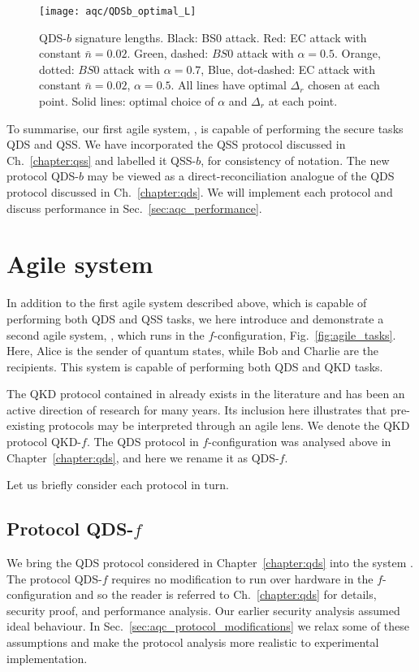 \begin{figure}[htp]
\captionsetup{width=\linewidth}
\centering
\texttt{[image: aqc/QDSb\_optimal\_L]}
\caption{\label{fig:aqc_qdsb_lengths} QDS-$b$ signature lengths. Black: BS$0$ attack. Red: EC attack with constant $\bar{n} = 0.02$. Green, dashed: $BS0$ attack with $\alpha=0.5$. Orange, dotted: $BS0$ attack with $\alpha=0.7$, Blue, dot-dashed: EC attack with constant $\bar{n}=0.02$, $\alpha=0.5$. All lines have optimal $\Delta_r$ chosen at each point. Solid lines: optimal choice of $\alpha$ and $\Delta_r$ at each point.}
\end{figure}

To summarise, our first agile system, \systemB, is capable of performing the secure tasks QDS and QSS. We have incorporated the QSS protocol discussed in Ch.~\ref{chapter:qss} and labelled it QSS-$b$, for consistency of notation. The new protocol QDS-$b$ may be viewed as a direct-reconciliation analogue of the QDS protocol discussed in Ch.~\ref{chapter:qds}. We will implement each protocol and discuss performance in Sec.~\ref{sec:aqc_performance}.

\section{Agile system \systemF}\label{sec:aqc_systemf}

In addition to the first agile system described above, which is capable of performing both QDS and QSS tasks, we here introduce and demonstrate a second agile system, \systemF, which runs in the $f$-configuration, Fig.~\ref{fig:agile_tasks}. Here, Alice is the sender of quantum states, while Bob and Charlie are the recipients. This system is capable of performing both QDS and QKD tasks.

The QKD protocol contained in \systemF \; already exists in the literature \cite{Leverrier2011, Papanastasiou2018} and has been an active direction of research for many years. Its inclusion here illustrates that pre-existing protocols may be interpreted through an agile lens. We denote the QKD protocol QKD-$f$. The QDS protocol in $f$-configuration was analysed above in Chapter~\ref{chapter:qds}, and here we rename it as QDS-$f$.

Let us briefly consider each protocol in turn.

\subsection{Protocol QDS-$f$}
We bring the QDS protocol considered in Chapter~\ref{chapter:qds} into the system \systemF. The protocol QDS-$f$ requires no modification to run over hardware in the $f$-configuration and so the reader is referred to Ch.~\ref{chapter:qds} for details, security proof, and performance analysis. Our earlier security analysis assumed ideal behaviour. In Sec.~\ref{sec:aqc_protocol_modifications} we relax some of these assumptions and make the protocol analysis more realistic to experimental implementation.


